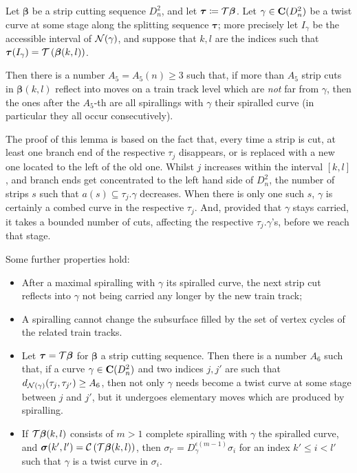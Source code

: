 \begin{lemma}\label{lem:nonspiralbound}
Let $\bm\beta$ be a strip cutting sequence $D^2_n$, and let $\bm\tau\coloneqq {\mathcal T}\bm\beta$. Let $\gamma\in\mathbf C(D^2_n)$ be a twist curve at some stage along the splitting sequence $\bm\tau$; more precisely let $I_\gamma$ be the accessible interval of ${\mathcal N}(\gamma)$, and suppose that $k,l$ are the indices such that $\bm\tau(I_\gamma)={\mathcal T}\left(\bm\beta(k,l)\right)$.

Then there is a number $A_5=A_5(n)\geq 3$ such that, if more than $A_5$ strip cuts in $\bm\beta(k,l)$ reflect into moves on a train track level which are \emph{not} far from $\gamma$, then the ones after the $A_5$-th are all spirallings with $\gamma$ their spiralled curve (in particular they all occur consecutively).
\end{lemma}

The proof of this lemma is based on the fact that, every time a strip is cut, at least one branch end of the respective $\tau_j$ disappears, or is replaced with a new one located to the left of the old one. Whilst $j$ increases within the interval $[k,l]$, and branch ends get concentrated to the left hand side of $D^2_n$, the number of strips $s$ such that $a(s)\subseteq \tau_j.\gamma$ decreases. When there is only one such $s$, $\gamma$ is certainly a combed curve in the respective $\tau_j$. And, provided that $\gamma$ stays carried, it takes a bounded number of cuts, affecting the respective $\tau_j.\gamma$'s, before we reach that stage.

Some further properties hold:
\begin{itemize}
\item After a maximal spiralling with $\gamma$ its spiralled curve, the next strip cut reflects into $\gamma$ not being carried any longer by the new train track;
\item A spiralling cannot change the subsurface filled by the set of vertex cycles of the related train tracks.
\item Let $\bm\tau={\mathcal T}\bm\beta$ for $\bm\beta$ a strip cutting sequence. Then there is a number $A_6$ such that, if a curve $\gamma\in\mathbf C(D^2_n)$ and two indices $j,j'$ are such that $d_{{\mathcal N}(\gamma)}(\tau_j,\tau_{j'})\geq A_6$, then not only $\gamma$ needs become a twist curve at some stage between $j$ and $j'$, but it undergoes elementary moves which are produced by spiralling.
\item If ${\mathcal T}\bm\beta(k,l)$ consists of $m>1$ complete spiralling with $\gamma$ the spiralled curve, and $\bm\sigma(k',l')={\mathcal C}\left({\mathcal T}\bm\beta(k,l)\right)$, then $\sigma_{l'}=D_\gamma^{\epsilon (m-1)}\sigma_i$ for an index $k'\leq i<l'$ such that $\gamma$ is a twist curve in $\sigma_i$.
\end{itemize}

